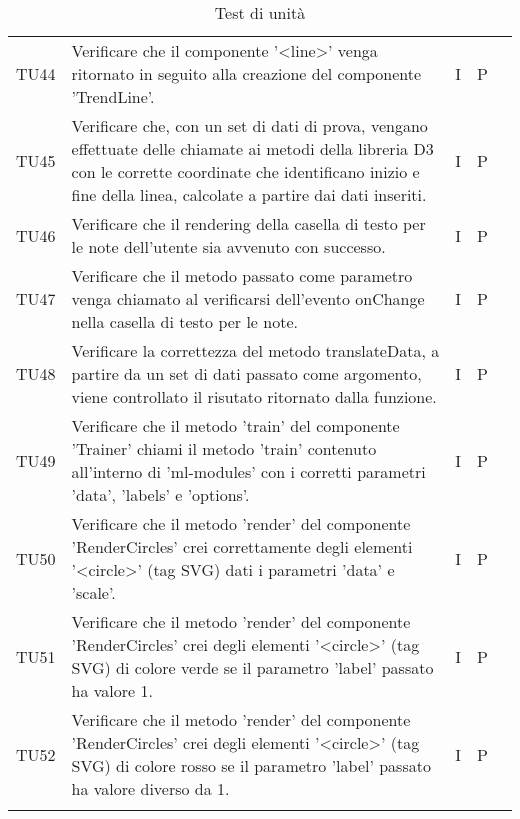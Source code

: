 \begin{longtable} {
		>{}p{15mm} 
		>{}p{79.5mm}
		>{}p{15mm} 
		>{}p{15mm}
		>{}p{0mm}}
	TU44	& Verificare che il componente '<line>' venga ritornato in seguito alla creazione del componente 'TrendLine'. & I & P &\TBstrut \\ [2mm]
	TU45	& Verificare che, con un set di dati di prova, vengano effettuate delle chiamate ai metodi della libreria D3 con le corrette coordinate che identificano inizio e fine della linea, calcolate a partire dai dati inseriti. & I & P &\TBstrut \\ [2mm]
	TU46	& Verificare che il rendering della casella di testo per le note dell'utente sia avvenuto con successo. & I & P &\TBstrut \\ [2mm]
	TU47	& Verificare che il metodo passato come parametro venga chiamato al verificarsi dell'evento onChange nella casella di testo per le note. & I & P &\TBstrut \\ [2mm]
	TU48	& Verificare la correttezza del metodo translateData, a partire da un set di dati passato come argomento, viene controllato il risutato ritornato dalla funzione. & I & P &\TBstrut \\ [2mm]
	TU49	& Verificare che il metodo 'train' del componente 'Trainer' chiami il metodo 'train' contenuto all'interno di 'ml-modules' con i corretti parametri 'data', 'labels' e 'options'. & I & P &\TBstrut \\ [2mm]
	TU50	& Verificare che il metodo 'render' del componente 'RenderCircles' crei correttamente degli elementi '<circle>' (tag SVG) dati i parametri 'data' e 'scale'. & I & P &\TBstrut \\ [2mm]
	TU51	& Verificare che il metodo 'render' del componente 'RenderCircles' crei degli elementi '<circle>' (tag SVG) di colore verde se il parametro 'label' passato ha valore 1. & I & P &\TBstrut \\ [2mm]
	TU52	& Verificare che il metodo 'render' del componente 'RenderCircles' crei degli elementi '<circle>' (tag SVG) di colore rosso se il parametro 'label' passato ha valore diverso da 1. & I & P &\TBstrut \\ [2mm]
	\rowcolor{white}
	\caption{Test di unità}
\end{longtable}
